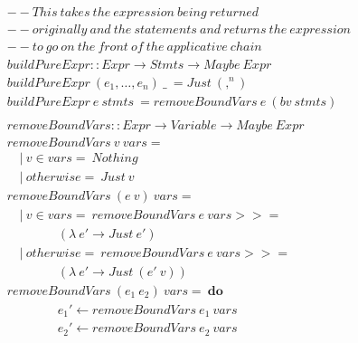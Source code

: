 \DIFdelbegin \subsubsection{}
\addtocounter{subsubsection}{-1}%
\DIFdelend \DIFaddbegin \subsection{}
\DIFaddend 

\vspace{5pt}
\DIFdelbegin %
\DIFdelendFL \DIFaddbeginFL \begin{figure}[h!]
\DIFaddendFL \begin{math}
\begin{aligned}
&--This\ takes\ the\ expression\ being\ returned\\
&--originally\ and\ the\ statements\ and\ returns\ the\ expression\\
&--to\ go\ on\ the\ front\ of\ the\ applicative\ chain\\
&buildPureExpr :: Expr \rightarrow Stmts \rightarrow Maybe\ Expr\\
&buildPureExpr\ (e_1,\ldots, e_n)\ \_\ = Just\ (,^n)\\
&buildPureExpr\ e\ stmts\ = removeBoundVars\ e\ (bv\ stmts)\\
\\
&removeBoundVars :: Expr \rightarrow {Variable} \rightarrow Maybe\ Expr\\
&removeBoundVars\ v\ vars =\\
&\quad |\ v \in vars =\ Nothing\\
&\quad |\ otherwise =\ Just\ v\\
&removeBoundVars\ (e\ v)\ vars =\\
&\quad |\ v \in vars =\ removeBoundVars\ e\ vars >>=\\ 
&\qquad \qquad(\lambda\ e' \rightarrow Just\ e')\\
&\quad |\ otherwise =\ removeBoundVars\ e\ vars >>=\\ 
&\qquad \qquad(\lambda\ e' \rightarrow Just\ (e'\ v))\\
&removeBoundVars\ (e_1\ e_2)\ vars =\ \textbf{do}\\
&\qquad \qquad e_1' \leftarrow removeBoundVars\ e_1\ vars\\
&\qquad \qquad e_2' \leftarrow removeBoundVars\ e_2\ vars\\

\end{aligned}
\end{math}
\end{figure}
